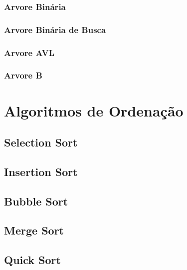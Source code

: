 \documentclass[10pt,a4paper]{article}
\begin{document}
\subsubsection{Arvore Binária}
\subsubsection{Arvore Binária de Busca}
\subsubsection{Arvore AVL}
\subsubsection{Arvore B}


\section{Algoritmos de Ordenação}
\subsection{Selection Sort}
\subsection{Insertion Sort}
\subsection{Bubble Sort}
\subsection{Merge Sort}
\subsection{Quick Sort}
\end{document}
